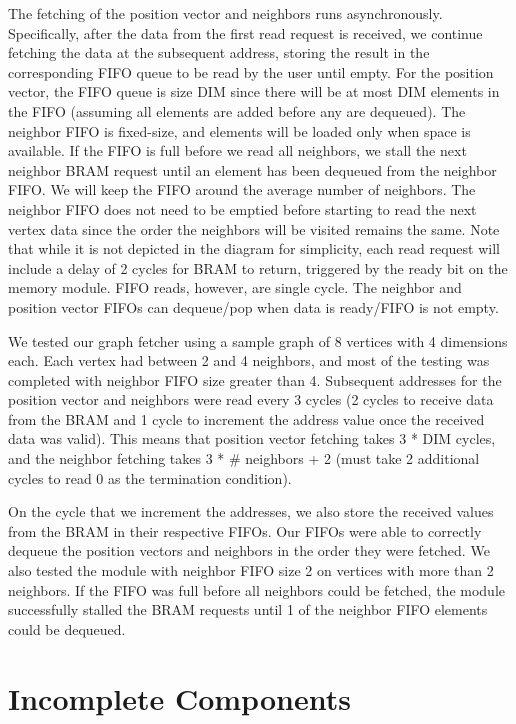 \documentclass[conference]{IEEEtran}
\begin{document}
The fetching of the position vector and neighbors runs asynchronously. Specifically, after the data from the first  read request is received, we continue fetching the data at the subsequent address, storing the result in the corresponding FIFO queue to be read by the user until empty. For the position vector, the FIFO queue is size DIM since there will be at most DIM elements in the FIFO (assuming all elements are added before any are dequeued). The neighbor FIFO is fixed-size, and elements will be loaded only when space is available. If the FIFO is full before we read all neighbors, we stall the next neighbor BRAM request until an element has been dequeued from the neighbor FIFO. We will keep the FIFO around the average number of neighbors. The neighbor FIFO does not need to be emptied before starting to read the next vertex data since the order the neighbors will be visited remains the same. Note that while it is not depicted in the diagram for simplicity, each read request will include a delay of 2 cycles for BRAM to return, triggered by the ready bit on the memory module. FIFO reads, however, are single cycle. The neighbor and position vector FIFOs can dequeue/pop when data is ready/FIFO is not empty.

We tested our graph fetcher using a sample graph of 8 vertices with 4 dimensions each. Each vertex had between 2 and 4 neighbors, and most of the testing was completed with neighbor FIFO size greater than 4. Subsequent addresses for the position vector and neighbors were read every 3 cycles (2 cycles to receive data from the BRAM and 1 cycle to increment the address value once the received data was valid). This means that position vector fetching takes 3 * DIM cycles, and the neighbor fetching takes 3 * \# neighbors + 2 (must take 2 additional cycles to read 0 as the termination condition).

On the cycle that we increment the addresses, we also store the received values from the BRAM in their respective FIFOs. Our FIFOs were able to correctly dequeue the position vectors and neighbors in the order they were fetched. We also tested the module with neighbor FIFO size 2 on vertices with more than 2 neighbors. If the FIFO was full before all neighbors could be fetched, the module successfully stalled the BRAM requests until 1 of the neighbor FIFO elements could be dequeued.


\section{Incomplete Components}
\end{document}
